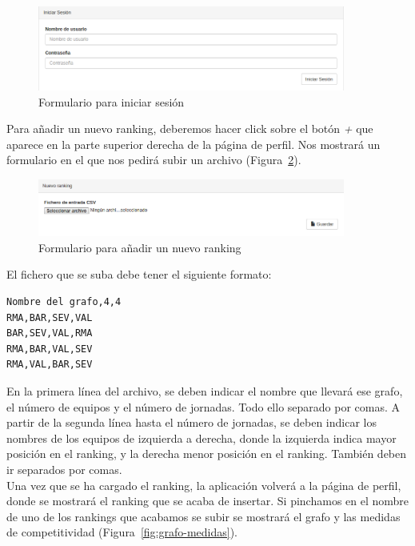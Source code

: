 \begin{figure}[htb]
\centering
\includegraphics[width=0.9\textwidth]{imagenes/pantallazos-aplicacion/inicio-sesion}
\caption{Formulario para iniciar sesión}
\label{fig:inicio-sesion}
\end{figure}

Para añadir un nuevo ranking, deberemos hacer click sobre el botón \emph{+} que aparece en la parte superior derecha de la página de perfil. Nos mostrará un formulario en el que nos pedirá subir un archivo (Figura~\ref{fig:nuevo-ranking}). \\

\begin{figure}[htb]
\centering
\includegraphics[width=0.9\textwidth]{imagenes/pantallazos-aplicacion/nuevo-ranking}
\caption{Formulario para añadir un nuevo ranking}
\label{fig:nuevo-ranking}
\end{figure}

El fichero que se suba debe tener el siguiente formato:

\begin{verbatim}
Nombre del grafo,4,4
RMA,BAR,SEV,VAL
BAR,SEV,VAL,RMA
RMA,BAR,VAL,SEV
RMA,VAL,BAR,SEV
\end{verbatim}

En la primera línea del archivo, se deben indicar el nombre que llevará ese grafo, el número de equipos y el número de jornadas. Todo ello separado por comas. A partir de la segunda línea hasta el número de jornadas, se deben indicar los nombres de los equipos de izquierda a derecha, donde la izquierda indica mayor posición en el ranking, y la derecha menor posición en el ranking. También deben ir separados por comas.\\

Una vez que se ha cargado el ranking, la aplicación volverá a la página de perfil, donde se mostrará el ranking que se acaba de insertar. Si pinchamos en el nombre de uno de los rankings que acabamos se subir se mostrará el grafo y las medidas de competitividad (Figura~\ref{fig:grafo-medidas}). 

